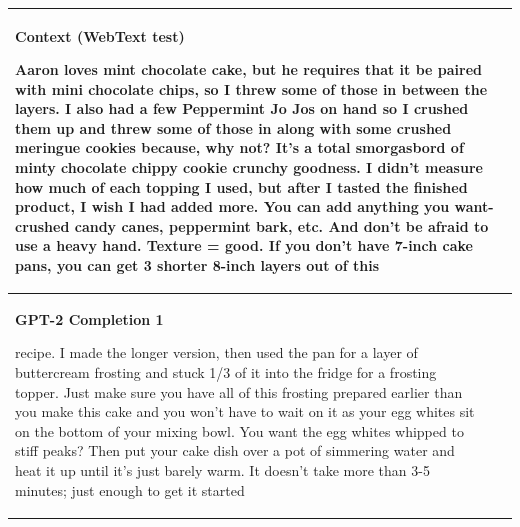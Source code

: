\documentclass{article}
\begin{document}
\begin{table}[t]
\begin{center}
\begin{tabular}{|p{5cm}|p{5cm}|p{5cm}|}

\hline
\multicolumn{3}{|C{16cm}|}{
\centerline{\textbf{Context (WebText test)}}
Aaron loves mint chocolate cake, but he requires that it be paired with mini chocolate chips, so I threw some of those in between the layers. I also had a few Peppermint Jo Jos on hand so I crushed them up and threw some of those in along with some crushed meringue cookies because, why not? It's a total smorgasbord of minty chocolate chippy cookie crunchy goodness. I didn't measure how much of each topping I used, but after I tasted the finished product, I wish I had added more. You can add anything you want- crushed candy canes, peppermint bark, etc. And don't be afraid to use a heavy hand. Texture = good.
\newline\newline
If you don't have 7-inch cake pans, you can get 3 shorter 8-inch layers out of this
} \\
\hline
\centerline{\textbf{GPT-2 Completion 1}}

 recipe. I made the longer version, then used the pan for a layer of buttercream frosting and stuck 1/3 of it into the fridge for a frosting topper. Just make sure you have all of this frosting prepared earlier than you make this cake and you won't have to wait on it as your egg whites sit on the bottom of your mixing bowl.
\newline\newline
You want the egg whites whipped to stiff peaks? Then put your cake dish over a pot of simmering water and heat it up until it's just barely warm. It doesn't take more than 3-5 minutes; just enough to get it started



\end{tabular}
\end{center}
\end{table}
\end{document}
